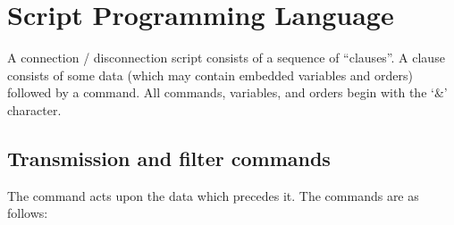 \documentclass[letterpaper,10pt,english]{sphinxmanual}
\begin{document}
\ignorespaces 

\section{Script Programming Language}
\label{\detokenize{connectivity_guide:script-programming-language}}\label{\detokenize{connectivity_guide:index-120}}
\sphinxAtStartPar
A connection / disconnection script consists of a sequence of “clauses”. A clause consists of some data (which may contain embedded variables and orders) followed by a command. All commands, variables, and orders begin with the ‘\&’ character.

\ignorespaces 

\subsection{Transmission and filter commands}
\label{\detokenize{connectivity_guide:transmission-and-filter-commands}}\label{\detokenize{connectivity_guide:index-121}}
\sphinxAtStartPar
The command acts upon the data which precedes it. The commands are as follows:\sphinxhyphen{}
\end{document}
